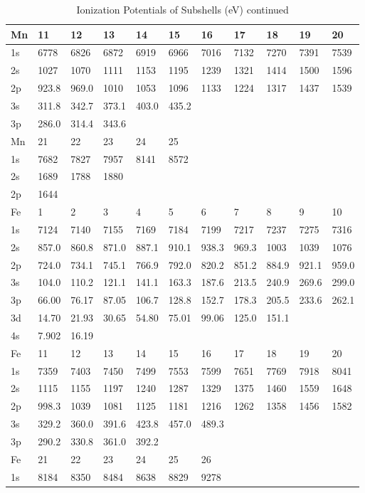 \begin{table}
\caption{Ionization Potentials of Subshells (eV) continued}
\begin{tabular}{lllllllllll}
\hline
Mn&  11&  12&  13&  14&  15&  16&  17&  18&  19&  20\\
\hline
1s&  6778&  6826&  6872&  6919&  6966&
7016&  7132&  7270&  7391&  7539\\
2s&  1027&  1070&  1111&  1153&  1195&  1239&  1321&
1414&  1500&  1596\\
2p& 923.8& 969.0& 1010&  1053&  1096&  1133&  1224&  1317&  1437&
1539\\
3s& 311.8& 342.7& 373.1& 403.0& 435.2\\
3p& 286.0& 314.4& 343.6\\
\hline
Mn&  21&  22&  23&
24& 25\\
\hline
1s& 7682&  7827&  7957&  8141&  8572\\
2s&  1689&  1788&  1880\\
2p&  1644\\
\hline
Fe& 1&
2&   3&   4&   5&   6&   7&   8&   9&  10\\
1s&  7124&  7140&  7155&  7169&  7184&  7199&
7217&  7237&  7275&  7316\\
2s& 857.0& 860.8& 871.0& 887.1& 910.1& 938.3& 969.3& 1003&
1039&  1076\\
2p& 724.0& 734.1& 745.1& 766.9& 792.0& 820.2& 851.2& 884.9& 921.1& 959.0\\
3s&
104.0& 110.2& 121.1& 141.1& 163.3& 187.6& 213.5& 240.9& 269.6& 299.0\\
3p& 66.00& 76.17&
87.05& 106.7& 128.8& 152.7& 178.3& 205.5& 233.6& 262.1\\
3d& 14.70& 21.93& 30.65& 54.80&
75.01& 99.06& 125.0& 151.1\\
4s& 7.902& 16.19\\
\hline
Fe&  11&  12&  13&  14&  15&  16&  17&  18&
19&  20\\
1s&  7359&  7403&  7450&  7499&  7553&  7599&  7651&  7769&  7918&  8041\\
2s&
1115&  1155&  1197&  1240&  1287&  1329&  1375&  1460&  1559&  1648\\
2p& 998.3& 1039&
1081& 1125& 1181& 1216&  1262&  1358&  1456&  1582\\
3s& 329.2& 360.0& 391.6& 423.8&
457.0& 489.3\\
3p& 290.2& 330.8& 361.0& 392.2\\
\hline
Fe&  21&  22&  23&  24&  25&  26\\
\hline
1s&  8184&
8350&  8484&  8638&  8829&  9278\\

\end{tabular}
\end{table}
